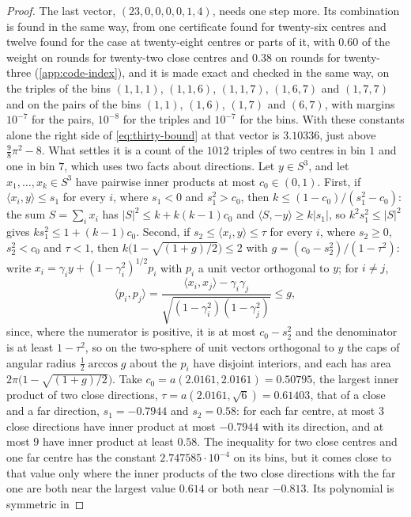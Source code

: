 \documentclass[11pt,reqno]{amsart}
\renewcommand{\_}{\origunderscore\allowbreak}
\numberwithin{equation}{section}
\theoremstyle{plain}
\theoremstyle{definition}
\theoremstyle{remark}
\begin{document}
\begin{proof}
The last vector, $(23,0,0,0,0,1,4)$, needs one step more. Its combination
is found in the same way, from one certificate found for twenty-six centres
and twelve found for the case at twenty-eight centres or parts of it, with
$0.60$ of the weight on rounds for twenty-two close centres and $0.38$ on
rounds for twenty-three (\cref{app:code-index}), and it is made exact and
checked in the same way, on the triples of the bins $(1,1,1)$, $(1,1,6)$,
$(1,1,7)$, $(1,6,7)$ and $(1,7,7)$ and on the pairs of the bins $(1,1)$,
$(1,6)$, $(1,7)$ and $(6,7)$, with margins $10^{-7}$ for the pairs,
$10^{-8}$ for the triples and $10^{-7}$ for the bins. With these constants
alone the right side of \eqref{eq:thirty-bound} at that vector is
$3.10336$, just above $\frac98\pi^2-8$. What settles it is a count of the
$1012$ triples of two centres in bin $1$ and one in bin $7$, which uses two
facts about directions. Let $y\in S^3$, and let $x_1,\dots,x_k\in S^3$
have pairwise inner products at most $c_0\in(0,1)$. First, if
$\langle x_i,y\rangle\le s_1$ for every $i$, where $s_1<0$ and
$s_1^2>c_0$, then $k\le(1-c_0)/(s_1^2-c_0)$: the sum $S=\sum_ix_i$ has
$|S|^2\le k+k(k-1)c_0$ and $\langle S,-y\rangle\ge k|s_1|$, so
$k^2s_1^2\le|S|^2$ gives $ks_1^2\le1+(k-1)c_0$. Second, if
$s_2\le\langle x_i,y\rangle\le\tau$ for every $i$, where $s_2\ge0$,
$s_2^2<c_0$ and $\tau<1$, then
$k\bigl(1-\sqrt{(1+g)/2}\bigr)\le2$ with $g=(c_0-s_2^2)/(1-\tau^2)$:
write $x_i=\gamma_iy+(1-\gamma_i^2)^{1/2}p_i$ with $p_i$ a unit vector
orthogonal to $y$; for $i\ne j$,
\[
  \langle p_i,p_j\rangle
  =\frac{\langle x_i,x_j\rangle-\gamma_i\gamma_j}{\sqrt{(1-\gamma_i^2)(1-\gamma_j^2)}}
  \le g ,
\]
since, where the numerator is positive, it is at most $c_0-s_2^2$ and
the denominator is at least $1-\tau^2$, so on the two-sphere of unit vectors
orthogonal to $y$ the caps of angular radius $\frac12\arccos g$ about the
$p_i$ have disjoint interiors, and each has area
$2\pi\bigl(1-\sqrt{(1+g)/2}\bigr)$. Take $c_0=a(2.0161,2.0161)=0.50795$, the
largest inner product of two close directions, $\tau=a(2.0161,\sqrt6)=0.61403$,
that of a close and a far direction, $s_1=-0.7944$ and $s_2=0.58$: for each far
centre, at most $3$ close directions have inner product at most $-0.7944$
with its direction, and at most $9$ have inner product at least $0.58$. The
inequality for two close centres and one far centre has the constant
$2.747585\cdot10^{-4}$ on its bins, but it comes close to that value only where the inner
products of the two close directions with the far one are both near the
largest value $0.614$ or both near $-0.813$. Its polynomial is symmetric in

\end{proof}
\end{document}
